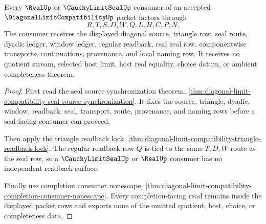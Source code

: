 \begin{theorem}
\label{thm:diagonal-limit-compatibility-real-seal-factorization}
Every $\RealUp$ or $\CauchyLimitSealUp$ consumer of an accepted
$\DiagonalLimitCompatibilityUp$ packet factors through
$$
R,T,S,D,W,Q,L,H,C,P,N.
$$
The consumer receives the displayed diagonal source, triangle row, seal
route, dyadic ledger, window ledger, regular readback, real seal row,
componentwise transports, continuations, provenance, and local naming row. It
receives no quotient stream, selected host limit, host real equality, choice
datum, or ambient completeness theorem.
\end{theorem}
\begin{proof}
First read the seal source synchronization theorem,
\autoref{thm:diagonal-limit-compatibility-seal-source-synchronization}. It
fixes the source, triangle, dyadic, window, readback, seal, transport, route,
provenance, and naming rows before a seal-facing consumer can proceed.

Then apply the triangle readback lock,
\autoref{thm:diagonal-limit-compatibility-triangle-readback-lock}. The
regular readback row $Q$ is tied to the same $T,D,W$ route as the seal row,
so a $\CauchyLimitSealUp$ or $\RealUp$ consumer has no independent readback
surface.

Finally use completion consumer nonescape,
\autoref{thm:diagonal-limit-compatibility-completion-consumer-nonescape}.
Every completion-facing read remains inside the displayed packet rows and
exports none of the omitted quotient, host, choice, or completeness data.
\end{proof}

